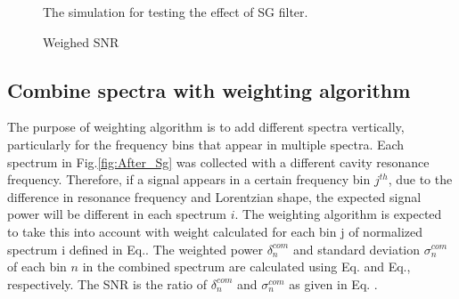 \begin{figure}[h]
    \begin{minipage}[h]{.5\textwidth}
    \centering
    \caption{The simulation for testing the effect of SG filter.}
    \label{fig:weighted_snr}
    \end{minipage}%
\end{figure}
\begin{figure}[h]
    \begin{minipage}[t]{.5\textwidth}
    \centering
    \caption{Weighed SNR}
    \label{fig:weighted_snr}
    \end{minipage}%
\end{figure}

\subsection{Combine spectra with weighting algorithm} \label{weighting_algorithm}

The purpose of weighting algorithm is to add different spectra vertically, particularly for the frequency bins that appear in multiple spectra.  Each spectrum in Fig.\ref{fig:After_Sg} was collected with a different cavity resonance frequency. Therefore, if a signal appears in a certain frequency bin $j^{th}$, due to the difference in resonance frequency and Lorentzian shape, the expected signal power will be different in each spectrum $i$. The weighting algorithm is expected to take this into account with weight calculated for each bin j of normalized spectrum i defined in Eq.\cite{eq:weight}.
The weighted power $\delta^{com}_{n}$ and standard deviation $\sigma^{com}_{n}$ of each bin $n$ in the combined spectrum are calculated using Eq.\cite{eq:weighted_power} and Eq.\cite{eq:weighted_sigma}, respectively. The SNR is the ratio of $\delta^{com}_{n}$ and $\sigma^{com}_{n}$ as given in Eq. \cite{eq:weighted_SNR}.


